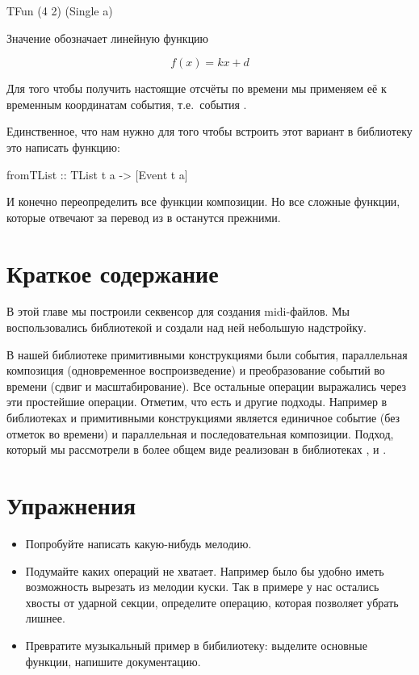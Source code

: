 \begin{code}
TFun (4 2) (Single a)
\end{code}

Значение  обозначает линейную функцию

\[ f(x) = k x + d \]

Для того чтобы получить настоящие отсчёты по времени мы
применяем её к временным координатам 
события, т.е.~события .

Единственное, что нам нужно для того
чтобы встроить этот вариант в библиотеку это написать
функцию:

\begin{code}
fromTList :: TList t a -> [Event t a]
\end{code}

И конечно переопределить все функции композиции.
Но все сложные функции, которые отвечают за перевод 
из  в  останутся прежними.


\section{Краткое содержание}

В этой главе мы построили секвенсор для создания 
midi-файлов. Мы воспользовались библиотекой  
и создали над ней небольшую надстройку. 

В нашей библиотеке примитивными конструкциями были
события, параллельная композиция (одновременное воспроизведение)
и преобразование событий во времени (сдвиг и масштабирование).
Все остальные операции выражались через эти простейшие операции.
Отметим, что есть и другие подходы. Например в библиотеках
 и  примитивными конструкциями
является единичное событие (без отметок во времени) и
параллельная и последовательная композиции. Подход, который
мы рассмотрели в более общем виде реализован в библиотеках
,  и
.

\section{Упражнения}

\begin{itemize}
\item  Попробуйте написать какую-нибудь мелодию.
\item  Подумайте каких операций не хватает. 
    Например было бы удобно иметь возможность вырезать 
    из мелодии куски. Так в примере у нас остались 
    хвосты от ударной секции, определите операцию,
    которая позволяет убрать лишнее.

\item Превратите музыкальный пример в бибилиотеку:
выделите основные функции, напишите документацию.
\end{itemize}


